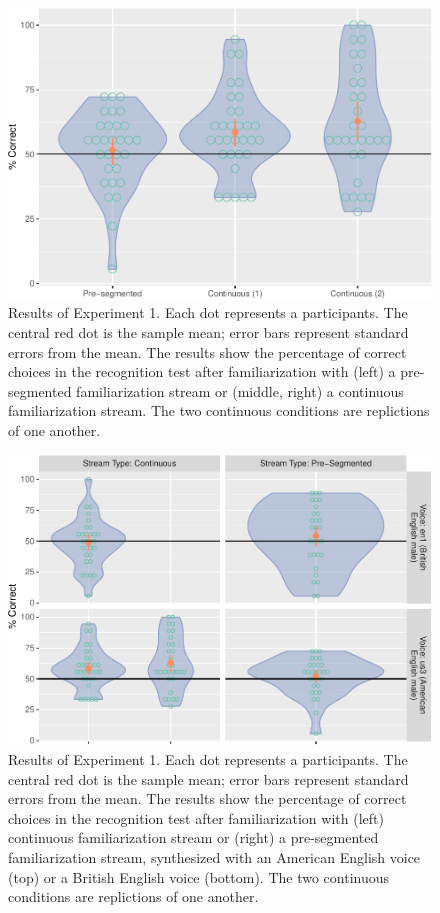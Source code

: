 \documentclass[
]{article}
\begin{document}
\begin{figure}

{\centering \includegraphics[width=0.8\linewidth]{segmentation_recall_combined_for_revision4_files/figure-latex/stats-london-stats.3x.us.segm.cont.plot-1} 

}

\caption{Results of Experiment 1. Each dot represents a participants. The central red dot is the sample mean; error bars represent standard errors from the mean. The results show the percentage of correct choices in the recognition test after familiarization with (left) a pre-segmented familiarization stream or (middle, right) a continuous familiarization stream. The two continuous conditions are replictions of one another.}\label{fig:stats-london-stats.3x.us.segm.cont.plot}
\end{figure}

\begin{figure}

{\centering \includegraphics[width=0.8\linewidth]{segmentation_recall_combined_for_revision4_files/figure-latex/stats-london-stats.3x.us.en.segm.cont.combined.plot-1} 

}

\caption{Results of Experiment 1. Each dot represents a participants. The central red dot is the sample mean; error bars represent standard errors from the mean. The results show the percentage of correct choices in the recognition test after familiarization with (left) continuous familiarization stream or (right) a pre-segmented familiarization stream, synthesized with an American English voice (top) or a British English voice (bottom). The two continuous conditions are replictions of one another.}\label{fig:stats-london-stats.3x.us.en.segm.cont.combined.plot}
\end{figure}
\end{document}
